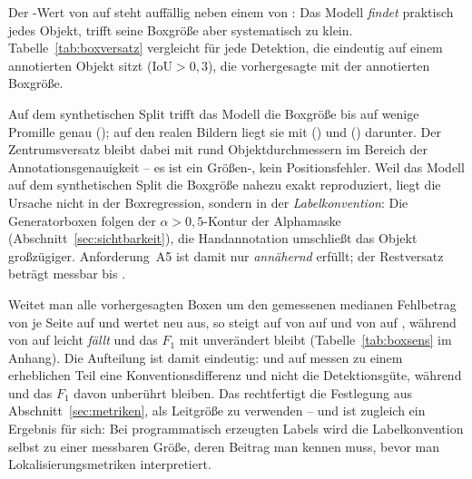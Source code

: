 Der \mAPseven{}-Wert von \zrefTestMapS{} auf  steht auffällig neben
einem \mAPfifty{} von \zrefTestMap: Das Modell \emph{findet} praktisch jedes
Objekt, trifft seine Boxgröße aber systematisch zu klein.
Tabelle~\ref{tab:boxversatz} vergleicht für jede Detektion, die eindeutig auf
einem annotierten Objekt sitzt ($\mathrm{IoU} > 0{,}3$), die vorhergesagte mit
der annotierten Boxgröße.



Auf dem synthetischen Split trifft das Modell die Boxgröße bis auf wenige Promille
genau (\zboxSvalRatio); auf den realen Bildern liegt sie mit \zboxValRatio{}
() und \zboxTestRatio{} () darunter. Der Zentrumsversatz
bleibt dabei mit rund \zboxTestCtr{} Objektdurchmessern im Bereich der
Annotationsgenauigkeit -- es ist ein Größen-, kein Positionsfehler. Weil das
Modell auf dem synthetischen Split die Boxgröße nahezu exakt reproduziert, liegt
die Ursache nicht in der Boxregression, sondern in der \emph{Labelkonvention}:
Die Generatorboxen folgen der $\alpha > 0{,}5$-Kontur der Alphamaske
(Abschnitt~\ref{sec:sichtbarkeit}), die Handannotation umschließt das Objekt
großzügiger. Anforderung~A5 ist damit nur \emph{annähernd} erfüllt; der
Restversatz beträgt messbar \zboxValOff{} bis \zboxTestOff\px.

Weitet man alle vorhergesagten Boxen um den gemessenen medianen Fehlbetrag von
\zsensTestGrow\px{} je Seite auf und wertet neu aus, so steigt \mAPseven{} auf
 von \zsensTestMapSOrig{} auf \textbf{\zsensTestMapSNeu} und
\mAPall{} von \zsensTestMapAOrig{} auf \textbf{\zsensTestMapANeu}, während
\mAPfifty{} von \zsensTestMapOrig{} auf \zsensTestMapNeu{} leicht \emph{fällt}
und das $F_1$ mit \zsensTestFfNeu{} unverändert bleibt
(Tabelle~\ref{tab:boxsens} im Anhang). Die Aufteilung ist damit eindeutig: \mAPseven{} und \mAPall{} auf
 messen zu einem erheblichen Teil eine Konventionsdifferenz und nicht
die Detektionsgüte, während \mAPfifty{} und das $F_1$ davon unberührt bleiben.
Das rechtfertigt die Festlegung aus Abschnitt~\ref{sec:metriken}, \mAPfifty{} als
Leitgröße zu verwenden -- und ist zugleich ein Ergebnis für sich: Bei
programmatisch erzeugten Labels wird die Labelkonvention selbst zu einer
messbaren Größe, deren Beitrag man kennen muss, bevor man
Lokalisierungsmetriken interpretiert.

